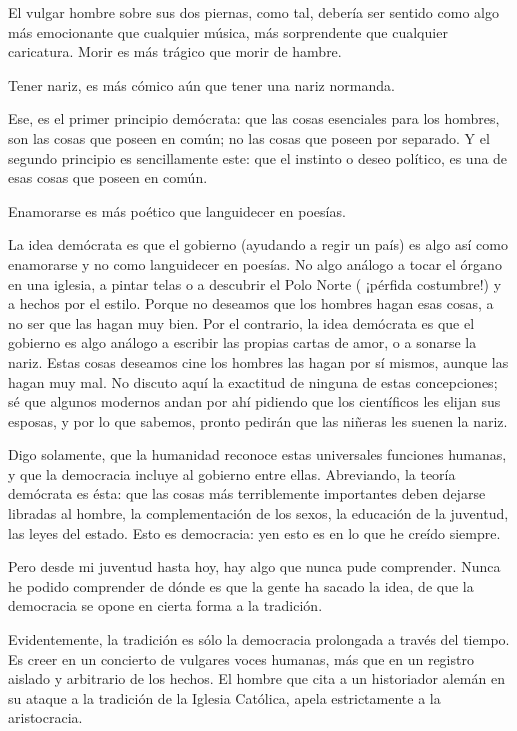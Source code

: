 El vulgar hombre sobre sus dos piernas, como tal, debería ser sentido como algo más emocionante
que cualquier música, más sorprendente que cualquier caricatura. Morir es más trágico que morir de
hambre.

Tener nariz, es más cómico aún que tener una nariz normanda.

Ese, es el primer principio demócrata: que las cosas esenciales para los hombres, son las cosas que
poseen en común; no las cosas que poseen por separado. Y el segundo principio es sencillamente este:
que el instinto o deseo político, es una de esas cosas que poseen en común.

Enamorarse es más poético que languidecer en poesías.

La idea demócrata es que el gobierno (ayudando a regir un país) es algo así como enamorarse y no
como languidecer en poesías. No algo análogo a tocar el órgano en una iglesia, a pintar telas o a descubrir
el Polo Norte ( ¡pérfida costumbre!) y a hechos por el estilo. Porque no deseamos que los hombres hagan
esas cosas, a no ser que las hagan muy bien. Por el contrario, la idea demócrata es que el gobierno es algo
análogo a escribir las propias cartas de amor, o a sonarse la nariz. Estas cosas deseamos cine los hombres
las hagan por sí mismos, aunque las hagan muy mal. No discuto aquí la exactitud de ninguna de estas
concepciones; sé que algunos modernos andan por ahí pidiendo que los científicos les elijan sus esposas,
y por lo que sabemos, pronto pedirán que las niñeras les suenen la nariz.

Digo solamente, que la humanidad reconoce estas universales funciones humanas, y que la
democracia incluye al gobierno entre ellas. Abreviando, la teoría demócrata es ésta: que las cosas más
terriblemente importantes deben dejarse libradas al hombre, la complementación de los sexos, la
educación de la juventud, las leyes del estado. Esto es democracia: yen esto es en lo que he creído
siempre.

Pero desde mi juventud hasta hoy, hay algo que nunca pude comprender. Nunca he podido
comprender de dónde es que la gente ha sacado la idea, de que la democracia se opone en cierta forma a
la tradición.

Evidentemente, la tradición es sólo la democracia prolongada a través del tiempo. Es creer en un
concierto de vulgares voces humanas, más que en un registro aislado y arbitrario de los hechos. El
hombre que cita a un historiador alemán en su ataque a la tradición de la Iglesia Católica, apela
estrictamente a la aristocracia.

